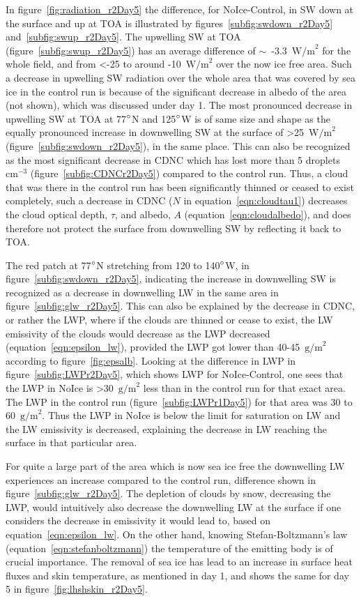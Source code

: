 In figure~\ref{fig:radiation_r2Day5} the difference, for NoIce-Control, in SW down at the surface and up at TOA is illustrated by figures~\ref{subfig:swdown_r2Day5} and~\ref{subfig:swup_r2Day5}. The upwelling SW at TOA (figure~\ref{subfig:swup_r2Day5}) has an average difference of $\sim$~-3.3~$\text{W/m}^2$ for the whole field, and from <-25 to around -10~$\text{W/m}^2$ over the now ice free area. Such a decrease in upwelling SW radiation over the whole area that was covered by sea ice in the control run is because of the significant decrease in albedo of the area (not shown), which was discussed under day 1. The most pronounced decrease in upwelling SW at TOA at 77$\degree$N and 125$\degree$W is of same size and shape as the equally pronounced increase in downwelling SW at the surface of >25~$\text{W/m}^2$ (figure~\ref{subfig:swdown_r2Day5}), in the same place. This can also be recognized as the most significant decrease in CDNC which has lost more than 5 droplets~$\text{cm}^{-3}$ (figure~\ref{subfig:CDNCr2Day5}) compared to the control run. Thus, a cloud that was there in the control run has been significantly thinned or ceased to exist completely, such a decrease in CDNC ($N$ in equation~\ref{eqn:cloudtau1}) decreases the cloud optical depth, $\tau$, and albedo, $A$ (equation~\ref{eqn:cloudalbedo}), and does therefore not protect the surface from downwelling SW by reflecting it back to TOA.

The red patch at 77$\degree$N stretching from 120 to 140$\degree$W, in figure~\ref{subfig:swdown_r2Day5}, indicating the increase in downwelling SW is recognized as a decrease in downwelling LW in the same area in figure~\ref{subfig:glw_r2Day5}. This can also be explained by the decrease in CDNC, or rather the LWP, where if the clouds are thinned or cease to exist, the LW emissivity of the clouds would decrease as the LWP decreased (equation~\ref{eqn:epsilon_lw}), provided the LWP got lower than 40-45~$\text{g/m}^2$ according to figure~\ref{fig:epsalb}. Looking at the difference in LWP in figure~\ref{subfig:LWPr2Day5}, which shows LWP for NoIce-Control, one sees that the LWP in NoIce is >30~$\text{g/m}^2$ less than in the control run for that exact area. The LWP in the control run (figure~\ref{subfig:LWPr1Day5}) for that area was 30 to 60~$\text{g/m}^2$. Thus the LWP in NoIce is below the limit for saturation on LW and the LW emissivity is decreased, explaining the decrease in LW reaching the surface in that particular area.

For quite a large part of the area which is now sea ice free the downwelling LW experiences an increase compared to the control run, difference shown in figure~\ref{subfig:glw_r2Day5}. The depletion of clouds by snow, decreasing the LWP, would intuitively also decrease the downwelling LW at the surface if one considers the decrease in emissivity it would lead to, based on equation~\ref{eqn:epsilon_lw}. On the other hand, knowing Stefan-Boltzmann's law (equation~\ref{eqn:stefanboltzmann}) the temperature of the emitting body is of crucial importance. The removal of sea ice has lead to an increase in surface heat fluxes and skin temperature, as mentioned in day 1, and shows the same for day 5 in figure~\ref{fig:lhshskin_r2Day5}.

